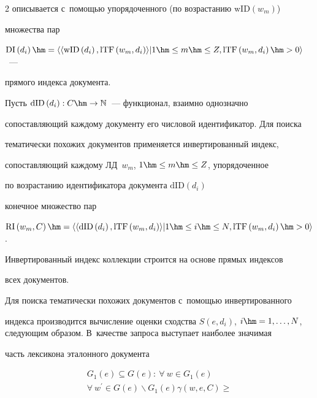 \begin{multicols}{2}
описывается с~помощью упорядоченного (по возрастанию $\mathrm{wID}\left(w_m\right)$) 

множества пар  

$\mathrm{DI}\left(d_i\right)\hm= \langle \langle \mathrm{wID}\left(d_i\right), 

\mathrm{lTF}\left(w_m, d_i\right)\rangle \vert 1\hm\leq 

m\hm\leq Z, \mathrm{lTF}\left(w_m, d_i\right)\hm> 0\rangle$~--- 

прямого индекса документа.



  Пусть $\mathrm{dID}\left(d_i\right): C\hm\to \mathbb{N}$~--- функционал, взаимно однозначно 

сопоставляющий каждому документу его числовой идентификатор. Для поиска 

тематически похожих документов применяется инвертированный индекс, 

сопоставляющий каждому ЛД~$w_m$, $1\hm\leq m\hm\leq Z$, упорядоченное 

по возрастанию идентификатора документа $\mathrm{dID}\left(d_i\right)$ 

конечное множество пар 

$\mathrm{RI}\left(w_m, C\right)\hm= \langle \langle \mathrm{dID}\left(d_i\right), 

\mathrm{lTF}\left(w_m, d_i\right)\rangle\vert 1\hm\leq 

i\hm\leq N, \mathrm{lTF}\left(w_m, d_i\right)\hm>0\rangle$. 

  

  Инвертированный индекс коллекции строится на основе прямых индексов 

всех документов.

  

  Для поиска тематически похожих документов с~помощью инвертированного 

индекса производится вычисление оценки сходства $S(e,d_i)$, $i\hm=1,\ldots ,

N$, следующим образом. В~качестве запроса выступает наиболее значимая 

часть лексикона эталонного документа

  \begin{multline*}

  G_1(e)\subseteq G(e):\ \forall\ w\in G_1(e)\\

  \forall\ w^\prime \in G(e)\backslash G_1(e)\gamma(w,e,C)\geq 


\end{multline*}
\end{multicols}
